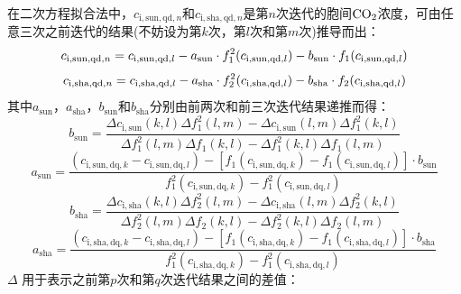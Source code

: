 在二次方程拟合法中，$c_{\mathrm{i,sun,qd},n}$和$c_{\mathrm{i,sha,qd},n}$是第$n$次迭代的胞间$\rm CO_2$浓度，可由任意三次之前迭代的结果(不妨设为第$k$次，第$l$次和第$m$次)推导而出：
\begin{equation}\label{cisunq}
c_{\mathrm{i,sun,qd},n} =c_{\mathrm{i,sun,qd},l} \\
  -a_{\mathrm{\mathrm{sun}}}\cdot f^2_{1}(c_{\mathrm{i,sun,qd},l}) - b_{\mathrm{\mathrm{sun}}}\cdot f_{1}(c_{\mathrm{i,sun,qd},l})
\end{equation}
\begin{equation}\label{cishaq}
c_{\mathrm{i,sha,qd},n} =c_{\mathrm{i,sha,qd},l} \\
  -a_{\mathrm{\mathrm{sha}}}\cdot f^2_{2}(c_{\mathrm{i,sha,qd},l}) - b_{\mathrm{\mathrm{sha}}}\cdot f_{2}(c_{\mathrm{i,sha,qd},l})
\end{equation}
%
其中$a_{\mathrm{sun}}$，$a_{\mathrm{sha}}$，$b_{\mathrm{sun}}$和$b_{\mathrm{sha}}$分别由前两次和前三次迭代结果递推而得：
\begin{equation}\label{iterbsun}
b_{\mathrm{sun}} = \frac{\Delta c_{\mathrm{i,sun}}\left(k,l\right)\Delta f^2_1\left(l,m\right)-\Delta c_{\mathrm{i,sun}}(l,m) \Delta f^2_1\left(k,l\right)}{\Delta f^2_1\left(l,m\right) \Delta f_1 \left(k,l\right)-\Delta f^2_1\left(k,l\right)\Delta f_1 \left(l,m\right)}
\end{equation}
\begin{equation}\label{iterasun}
a_{\mathrm{sun}} = \frac{\left(c_{\mathrm{i,sun,dq},k}-c_{\mathrm{i,sun,dq},l}\right)-\left[f_1(c_{\mathrm{i,sun,dq},k})-f_1(c_{\mathrm{i,sun,dq},l})\right]\cdot b_{\mathrm{\mathrm{sun}}}}{f^2_1(c_{\mathrm{i,sun,dq},k})-f^2_1(c_{\mathrm{i,sun,dq},l})}
\end{equation}
\begin{equation}\label{iterbsha}
b_{\mathrm{sha}} = \frac{\Delta c_{\mathrm{i,sha}}\left(k,l\right)\Delta f^2_2\left(l,m\right)-\Delta c_{\mathrm{i,sha}}(l,m) \Delta f^2_2\left(k,l\right)}{\Delta f^2_2\left(l,m\right) \Delta f_2 \left(k,l\right)-\Delta f^2_2\left(k,l\right)\Delta f_2 \left(l,m\right)}
\end{equation}
\begin{equation}\label{iterasha}
a_{\mathrm{sha}} = \frac{\left(c_{\mathrm{i,sha,dq},k}-c_{\mathrm{i,sha,dq},l}\right)-\left[f_1(c_{\mathrm{i,sha,dq},k})-f_1(c_{\mathrm{i,sha,dq},l})\right]\cdot b_{\mathrm{\mathrm{sha}}}}{f^2_1(c_{\mathrm{i,sha,dq},k})-f^2_1(c_{\mathrm{i,sha,dq},l})}
\end{equation}
$\Delta$ 用于表示之前第$p$次和第$q$次迭代结果之间的差值：
